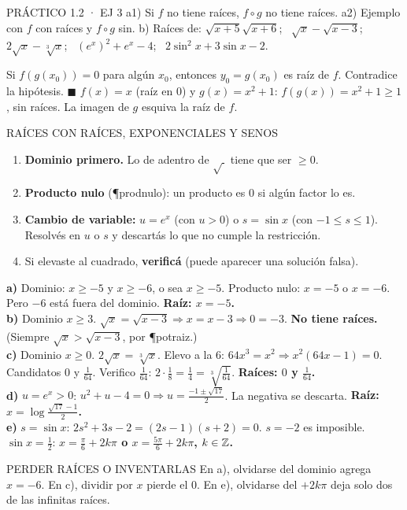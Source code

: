 \begin{enunciado}{PRÁCTICO 1.2 · EJ 3}
a1) Si $f$ no tiene raíces, $f\circ g$ no tiene raíces. a2) Ejemplo con $f$ con raíces y $f\circ g$ sin. b) Raíces de: $\sqrt{x+5}\sqrt{x+6}$; \ $\sqrt x-\sqrt{x-3}$; \ $2\sqrt x-\sqrt[3]x$; \ $(e^x)^2+e^x-4$; \ $2\sin^2x+3\sin x-2$.
\end{enunciado}
Si $f(g(x_0))=0$ para algún $x_0$, entonces $y_0=g(x_0)$ es raíz de $f$. Contradice la hipótesis. $\blacksquare$
$f(x)=x$ (raíz en 0) y $g(x)=x^2+1$: $f(g(x))=x^2+1\ge1$, sin raíces. La imagen de $g$ esquiva la raíz de $f$.
\begin{metodo}{RAÍCES CON RAÍCES, EXPONENCIALES Y SENOS}
\begin{enumerate}
\item \textbf{Dominio primero.} Lo de adentro de $\sqrt{\ }$ tiene que ser $\ge0$.
\item \textbf{Producto nulo} (\P{prodnulo}): un producto es 0 si algún factor lo es.
\item \textbf{Cambio de variable:} $u=e^x$ (con $u>0$) o $s=\sin x$ (con $-1\le s\le1$). Resolvés en $u$ o $s$ y descartás lo que no cumple la restricción.
\item Si elevaste al cuadrado, \textbf{verificá} (puede aparecer una solución falsa).
\end{enumerate}
\end{metodo}
\textbf{a)} Dominio: $x\ge-5$ y $x\ge-6$, o sea $x\ge-5$. Producto nulo: $x=-5$ o $x=-6$. Pero $-6$ está fuera del dominio. \textbf{Raíz: $x=-5$.}\\[3pt]
\textbf{b)} Dominio $x\ge3$. $\sqrt x=\sqrt{x-3}\Rightarrow x=x-3\Rightarrow0=-3$. \textbf{No tiene raíces.} (Siempre $\sqrt x>\sqrt{x-3}$, por \P{potraiz}.)\\[3pt]
\textbf{c)} Dominio $x\ge0$. $2\sqrt x=\sqrt[3]x$. Elevo a la 6: $64x^3=x^2\Rightarrow x^2(64x-1)=0$. Candidatos $0$ y $\frac1{64}$. Verifico $\frac1{64}$: $2\cdot\frac18=\frac14=\sqrt[3]{\frac1{64}}$\ok. \textbf{Raíces: $0$ y $\frac1{64}$.}\\[3pt]
\textbf{d)} $u=e^x>0$: $u^2+u-4=0\Rightarrow u=\frac{-1\pm\sqrt{17}}2$. La negativa se descarta. \textbf{Raíz: $x=\log\frac{\sqrt{17}-1}2$.}\\[3pt]
\textbf{e)} $s=\sin x$: $2s^2+3s-2=(2s-1)(s+2)=0$. $s=-2$ es imposible. $\sin x=\frac12$: \textbf{$x=\frac\pi6+2k\pi$ o $x=\frac{5\pi}6+2k\pi$, $k\in\mathbb{Z}$.}
\begin{trampa}{PERDER RAÍCES O INVENTARLAS}
En a), olvidarse del dominio agrega $x=-6$. En c), dividir por $x$ pierde el $0$. En e), olvidarse del $+2k\pi$ deja solo dos de las infinitas raíces.
\end{trampa}


